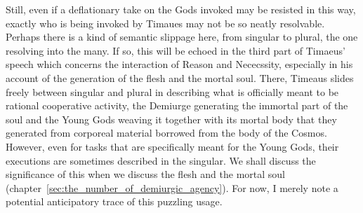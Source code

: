 Still, even if a deflationary take on the Gods invoked may be resisted in this way, exactly who is being invoked by Timaues may not be so neatly resolvable. Perhaps there is a kind of semantic slippage here, from singular to plural, the one resolving into the many. If so, this will be echoed in the third part of Timaeus' speech which concerns the interaction of Reason and Nececssity, especially in his account of the generation of the flesh and the mortal soul. There, Timeaus slides freely between singular and plural in describing what is officially meant to be rational cooperative activity, the Demiurge generating the immortal part of the soul and the Young Gods weaving it together with its mortal body that they generated from corporeal material borrowed from the body of the Cosmos. However, even for tasks that are specifically meant for the Young Gods, their executions are sometimes described in the singular. We shall discuss the significance of this when we discuss the flesh and the mortal soul (chapter~\ref{sec:the_number_of_demiurgic_agency}). For now, I merely note a potential anticipatory trace of this puzzling usage. 

